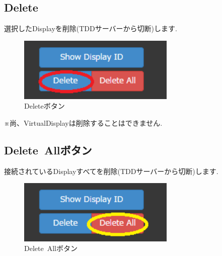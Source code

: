 \documentclass[a4paper,10pt,oneside]{jsbook}
\begin{document}
\subsection{Delete}
選択したDisplayを削除(TDDサーバーから切断)します.\\
\begin{figure}[htbp]
	\begin{center}
		\includegraphics[width=7.5cm]{image/3Button2.PNG}
	\end{center}
	\caption{Deleteボタン}
	\label{fig:deletebutton}
\end{figure}

※尚、VirtualDisplayは削除することはできません.\\



\subsection{Delete\ Allボタン}
接続されているDisplayすべてを削除(TDDサーバーから切断)します.\\

\begin{figure}[htbp]
	\begin{center}
		\includegraphics[width=7.5cm]{image/3Button3.PNG}
	\end{center}
	\caption{Delete\ Allボタン}
	\label{fig:deleteallbutton}
\end{figure}

\newpage


\end{document}
